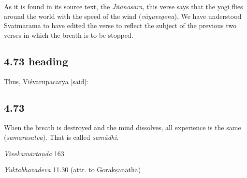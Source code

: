\begin{ekdosis}
\begin{philcomm}[hp04_072]
As it is found in its source text, the \emph{Jñānasāra}, this verse says that the yogi flies around the world with the speed of the wind (\emph{vāyuvegena}). We have understood Svātmārāma to have edited the verse to reflect the subject of the previous two verses in which the breath is to be stopped.
\end{philcomm}

\subsection*{4.73 heading}
\begin{translation}[hp04_073a]
Thus, Viśvarūpācārya [said]:
\end{translation}


\subsection*{4.73}
\begin{translation}[hp04_073]
When the breath is destroyed and the mind dissolves, all experience is the same (\emph{samarasatva}). That is called \emph{samādhi}.
\end{translation}

\begin{sources}[hp04_073]
\emph{Vivekamārtaṇḍa} 163
\begin{versinnote}
\end{versinnote}
\end{sources}

\begin{testimonia}[hp04_073]
\emph{Yuktabhavadeva} 11.30 (attr. to Gorakṣanātha)
\begin{versinnote}
\tl{\var{yadā ] tadā}\\!}
\end{versinnote}


\end{testimonia}
\end{ekdosis}
